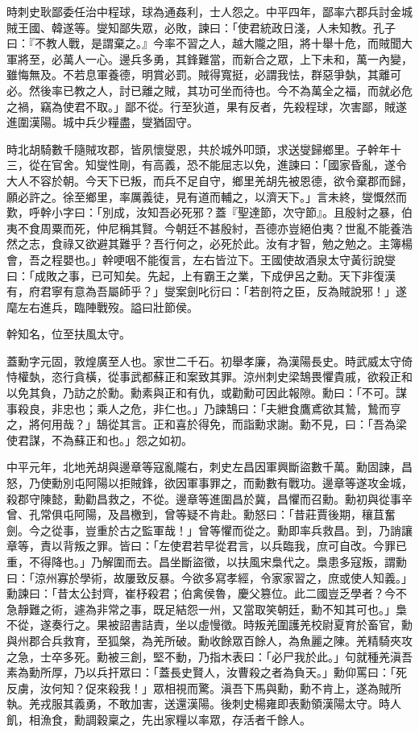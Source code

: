 \begin{pinyinscope}
時刺史耿鄙委任治中程球，球為通姦利，士人怨之。中平四年，鄙率六郡兵討金城賊王國、韓遂等。燮知鄙失眾，必敗，諫曰：「使君統政日淺，人未知教。孔子曰：『不教人戰，是謂棄之。』今率不習之人，越大隴之阻，將十舉十危，而賊聞大軍將至，必萬人一心。邊兵多勇，其鋒難當，而新合之眾，上下未和，萬一內變，雖悔無及。不若息軍養德，明賞必罰。賊得寬挺，必謂我怯，群惡爭埶，其離可必。然後率已教之人，討已離之賊，其功可坐而待也。今不為萬全之福，而就必危之禍，竊為使君不取。」鄙不從。行至狄道，果有反者，先殺程球，次害鄙，賊遂進圍漢陽。城中兵少糧盡，燮猶固守。

時北胡騎數千隨賊攻郡，皆夙懷燮恩，共於城外叩頭，求送燮歸鄉里。子幹年十三，從在官舍。知燮性剛，有高義，恐不能屈志以免，進諫曰：「國家昏亂，遂令大人不容於朝。今天下已叛，而兵不足自守，鄉里羌胡先被恩德，欲令棄郡而歸，願必許之。徐至鄉里，率厲義徒，見有道而輔之，以濟天下。」言未終，燮慨然而歎，呼幹小字曰：「別成，汝知吾必死邪？蓋『聖達節，次守節』。且殷紂之暴，伯夷不食周粟而死，仲尼稱其賢。今朝廷不甚殷紂，吾德亦豈絕伯夷？世亂不能養浩然之志，食祿又欲避其難乎？吾行何之，必死於此。汝有才智，勉之勉之。主簿楊會，吾之程嬰也。」幹哽咽不能復言，左右皆泣下。王國使故酒泉太守黃衍說燮曰：「成敗之事，已可知矣。先起，上有霸王之業，下成伊呂之勳。天下非復漢有，府君寧有意為吾屬師乎？」燮案劍叱衍曰：「若剖符之臣，反為賊說邪！」遂麾左右進兵，臨陣戰歿。謚曰壯節侯。

幹知名，位至扶風太守。

蓋勳字元固，敦煌廣至人也。家世二千石。初舉孝廉，為漢陽長史。時武威太守倚恃權埶，恣行貪橫，從事武都蘇正和案致其罪。涼州刺史梁鵠畏懼貴戚，欲殺正和以免其負，乃訪之於勳。勳素與正和有仇，或勸勳可因此報隙。勳曰：「不可。謀事殺良，非忠也；乘人之危，非仁也。」乃諫鵠曰：「夫紲食鷹鳶欲其鷙，鷙而亨之，將何用哉？」鵠從其言。正和喜於得免，而詣勳求謝。勳不見，曰：「吾為梁使君謀，不為蘇正和也。」怨之如初。

中平元年，北地羌胡與邊章等寇亂隴右，刺史左昌因軍興斷盜數千萬。勳固諫，昌怒，乃使勳別屯阿陽以拒賊鋒，欲因軍事罪之，而勳數有戰功。邊章等遂攻金城，殺郡守陳懿，勳勸昌救之，不從。邊章等進圍昌於冀，昌懼而召勳。勳初與從事辛曾、孔常俱屯阿陽，及昌檄到，曾等疑不肯赴。勳怒曰：「昔莊賈後期，穰苴奮劍。今之從事，豈重於古之監軍哉！」曾等懼而從之。勳即率兵救昌。到，乃誚讓章等，責以背叛之罪。皆曰：「左使君若早從君言，以兵臨我，庶可自改。今罪已重，不得降也。」乃解圍而去。昌坐斷盜徵，以扶風宋梟代之。梟患多寇叛，謂勳曰：「涼州寡於學術，故屢致反暴。今欲多寫孝經，令家家習之，庶或使人知義。」勳諫曰：「昔太公封齊，崔杼殺君；伯禽侯魯，慶父篡位。此二國豈乏學者？今不急靜難之術，遽為非常之事，既足結怨一州，又當取笑朝廷，勳不知其可也。」梟不從，遂奏行之。果被詔書詰責，坐以虛慢徵。時叛羌圍護羌校尉夏育於畜官，勳與州郡合兵救育，至狐槃，為羌所破。勳收餘眾百餘人，為魚麗之陳。羌精騎夾攻之急，士卒多死。勳被三創，堅不動，乃指木表曰：「必尸我於此。」句就種羌滇吾素為勳所厚，乃以兵扞眾曰：「蓋長史賢人，汝曹殺之者為負天。」勳仰罵曰：「死反虜，汝何知？促來殺我！」眾相視而驚。滇吾下馬與勳，勳不肯上，遂為賊所執。羌戎服其義勇，不敢加害，送還漢陽。後刺史楊雍即表勳領漢陽太守。時人飢，相漁食，勳調穀稟之，先出家糧以率眾，存活者千餘人。


\end{pinyinscope}
